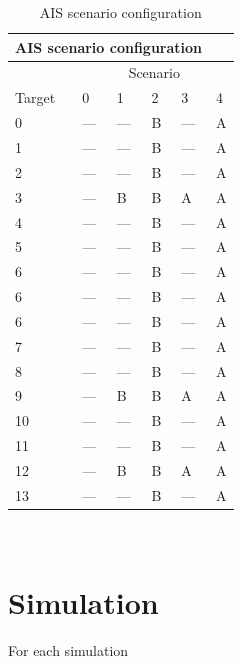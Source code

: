 \begin{table}
\centering
	\begin{tabularx}{0.5\textwidth}{XXXXXX}
	  \multicolumn{5}{c}{AIS scenario configuration} \\
	  \toprule
	  		 & \multicolumn{5}{c}{Scenario} \\
	  Target & 0 	& 1 	&  2 	&  3	& 4  	\\
	  \midrule
	  0 	& --- 	& --- 	& B 	& --- 	& A 	\\
	  1 	& --- 	& --- 	& B 	& --- 	& A 	\\
	  2 	& --- 	& --- 	& B 	& --- 	& A 	\\
	  3 	& ---	& B 	& B 	& A 	& A 	\\
	  4 	& --- 	& --- 	& B 	& --- 	& A 	\\
	  5 	& --- 	& --- 	& B 	& --- 	& A 	\\
	  6 	& --- 	& --- 	& B 	& --- 	& A 	\\
	  6 	& --- 	& --- 	& B 	& --- 	& A 	\\
	  6 	& --- 	& --- 	& B 	& --- 	& A 	\\
	  7 	& --- 	& --- 	& B 	& --- 	& A 	\\
	  8 	& --- 	& --- 	& B 	& --- 	& A 	\\
	  9 	& ---	& B 	& B 	& A 	& A 	\\
	  10 	& --- 	& --- 	& B 	& --- 	& A 	\\
	  11 	& --- 	& --- 	& B 	& --- 	& A 	\\
	  12 	& ---	& B 	& B 	& A 	& A 	\\
	  13 	& --- 	& --- 	& B 	& --- 	& A 	\\
	  \bottomrule
	\end{tabularx}~\caption{AIS scenario configuration}\label{tab:ais_scenarios}
\end{table}

\section{Simulation}
For each simulation